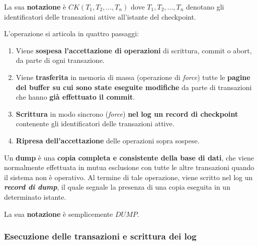 \documentclass[a4paper]{article}
\begin{document}
	\noindent
	La sua \textbf{notazione} è $CK\left(T_{1}, T_{2}, ..., T_{n}\right)$ dove $T_{1}, T_{2}, ..., T_{n}$ denotano gli identificatori delle transazioni attive all'istante del checkpoint.\newline
	
	\noindent
	L'operazione si articola in quattro passaggi:
	\begin{enumerate}
		\item Viene \textbf{sospesa l'accettazione di operazioni} di scrittura, \textsf{commit} o \textsf{abort}, da parte di ogni transazione.
		
		\item Viene \textbf{trasferita} in memoria di massa (operazione di \emph{force}) tutte le \textbf{pagine del buffer su cui sono state eseguite modifiche} da parte di transazioni che hanno \textbf{già effettuato il \textsf{commit}}.
		
		\item \textbf{Scrittura} in modo sincrono (\emph{force}) \textbf{nel log un record di checkpoint} contenente gli identificatori delle transazioni attive.
		
		\item \textbf{Ripresa dell'accettazione} delle operazioni sopra sospese.
	\end{enumerate}

	\noindent
	Un \textcolor{Red3}{\textbf{dump}} è una \textbf{copia completa e consistente della base di dati}, che viene normalmente effettuata in mutua esclusione con tutte le altre transazioni quando il sistema non è operativo. Al termine di tale operazione, viene scritto nel log un \textbf{\emph{record di dump}}, il quale segnale la presenza di una copia eseguita in un determinato istante.\newline
	
	\noindent
	La sua \textbf{notazione} è semplicemente $DUMP$.\newpage
	
	\subsubsection{Esecuzione delle transazioni e scrittura dei log}
	
\end{document}
